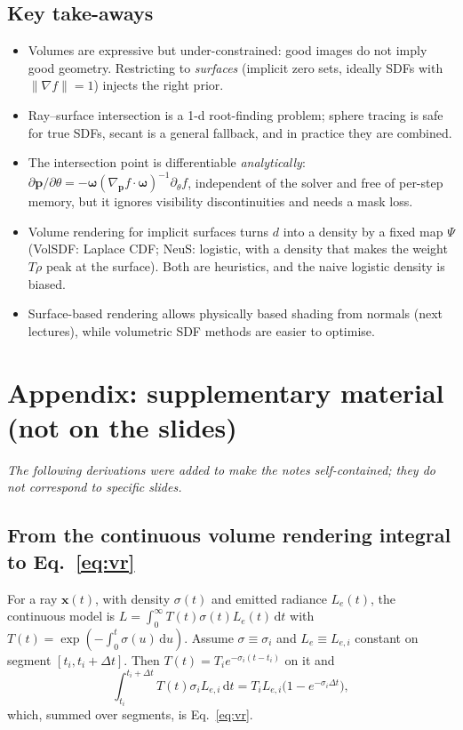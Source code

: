 \documentclass[11pt,a4paper]{article}
\newcommand{\bx}{\bm{x}}
\newcommand{\bp}{{\bm{p}}}
\newcommand{\bom}{{\bm{\omega}}}
\theoremstyle{definition}
\theoremstyle{plain}
\theoremstyle{remark}
\begin{document}
\subsection*{Key take-aways}
\begin{itemize}
\item Volumes are expressive but under-constrained: good images do not imply good geometry. Restricting to \emph{surfaces} (implicit zero sets, ideally SDFs with $\|\nabla f\|=1$) injects the right prior.
\item Ray--surface intersection is a 1-d root-finding problem; sphere tracing is safe for true SDFs, secant is a general fallback, and in practice they are combined.
\item The intersection point is differentiable \emph{analytically}: $\partial\bp/\partial\theta=-\bom(\nabla_{\bp} f\cdot\bom)^{-1}\partial_\theta f$, independent of the solver and free of per-step memory, but it ignores visibility discontinuities and needs a mask loss.
\item Volume rendering for implicit surfaces turns $d$ into a density by a fixed map $\Psi$ (VolSDF: Laplace CDF; NeuS: logistic, with a density that makes the weight $T\rho$ peak at the surface). Both are heuristics, and the naive logistic density is biased.
\item Surface-based rendering allows physically based shading from normals (next lectures), while volumetric SDF methods are easier to optimise.
\end{itemize}

\appendix
\section{Appendix: supplementary material (not on the slides)}
\emph{The following derivations were added to make the notes self-contained; they do not correspond to specific slides.}

\subsection{From the continuous volume rendering integral to Eq.~\texorpdfstring{\eqref{eq:vr}}{(1)}}
For a ray $\bx(t)$, with density $\sigma(t)$ and emitted radiance $L_e(t)$, the continuous model is
$L=\int_0^\infty T(t)\sigma(t)L_e(t)\,\mathrm dt$ with $T(t)=\exp(-\int_0^t\sigma(u)\,\mathrm du)$.
Assume $\sigma\equiv\sigma_i$ and $L_e\equiv L_{e,i}$ constant on segment $[t_i,t_i+\Delta t]$. Then $T(t)=T_i e^{-\sigma_i(t-t_i)}$ on it and
\[
\int_{t_i}^{t_i+\Delta t}T(t)\sigma_iL_{e,i}\,\mathrm dt=T_iL_{e,i}\bigl(1-e^{-\sigma_i\Delta t}\bigr),
\]
which, summed over segments, is Eq.~\eqref{eq:vr}.
\end{document}
